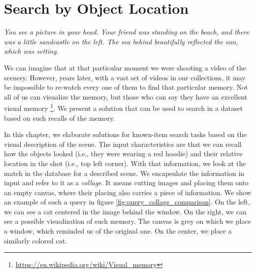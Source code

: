 \chapter{Search by Object Location}
\label{ch:object_location}

\emph{You see a picture in your head. Your friend was standing on the beach, and there was a little sandcastle on the left. The sea behind beautifully reflected the sun, which was setting.}

We can imagine that at that particular moment we were shooting a video of the scenery. However, years later, with a vast set of videos in our collections, it may be impossible to re-watch every one of them to find that particular memory. Not all of us can visualize the memory, but those who can say they have an excellent visual memory \footnote{\url{https://en.wikipedia.org/wiki/Visual_memory}}. We present a solution that can be used to search in a dataset based on such recalls of the memory.

In this chapter, we elaborate solutions for known-item search tasks based on the visual description of the scene. The input characteristics are that we can recall how the objects looked (i.e., they were wearing a red hoodie) and their relative location in the shot (i.e., top left corner). With that information, we look at the match in the database for a described scene. We encapsulate the information in input and refer to it as a \emph{collage}. It means cutting images and placing them onto an empty canvas, where their placing also carries a piece of information. We show an example of such a query in figure \ref{fig:query_collage_comparison}. On the left, we can see a cat centered in the image behind the window. On the right, we can see a possible visualization of such memory. The canvas is grey on which we place a window, which reminded us of the original one. On the center, we place a similarly colored cat.

